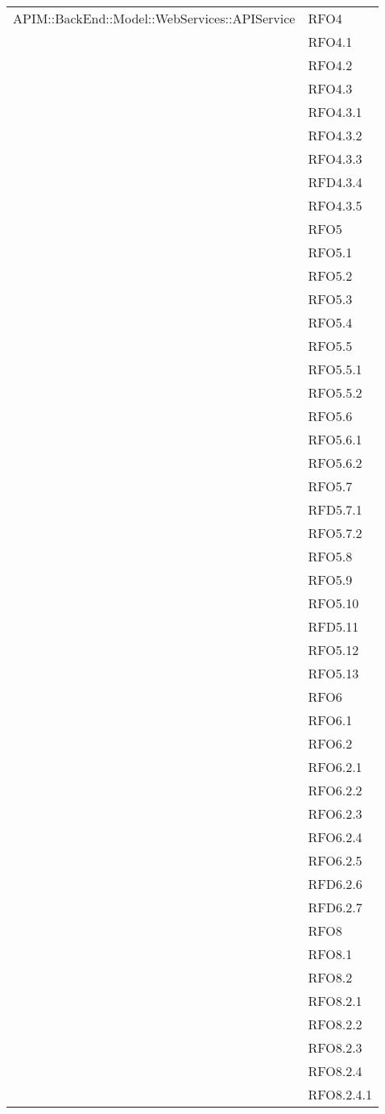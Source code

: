 \begin{longtable}{ p{12cm} | p{3cm} }
		    \hline
		    APIM::BackEnd::Model::WebServices::APIService
		    & RFO4 \\
		    & RFO4.1 \\
		    & RFO4.2 \\
		    & RFO4.3 \\
		    & RFO4.3.1 \\
		    & RFO4.3.2 \\
		    & RFO4.3.3 \\
		    & RFD4.3.4 \\
		    & RFO4.3.5 \\
		    & RFO5 \\
& RFO5.1 \\
& RFO5.2 \\
& RFO5.3 \\
& RFO5.4 \\
& RFO5.5 \\
& RFO5.5.1 \\
& RFO5.5.2 \\
& RFO5.6\\
& RFO5.6.1 \\
& RFO5.6.2 \\
& RFO5.7 \\
& RFD5.7.1 \\
& RFO5.7.2 \\
& RFO5.8 \\
& RFO5.9 \\
& RFO5.10 \\
& RFD5.11 \\
& RFO5.12 \\
& RFO5.13 \\
& RFO6 \\
& RFO6.1 \\
& RFO6.2 \\
& RFO6.2.1 \\
& RFO6.2.2 \\
& RFO6.2.3 \\
& RFO6.2.4 \\
& RFO6.2.5 \\
& RFD6.2.6 \\
& RFD6.2.7 \\
& RFO8 \\
& RFO8.1 \\
& RFO8.2 \\
& RFO8.2.1 \\
& RFO8.2.2 \\
& RFO8.2.3 \\
& RFO8.2.4 \\
& RFO8.2.4.1 \\

\end{longtable}
